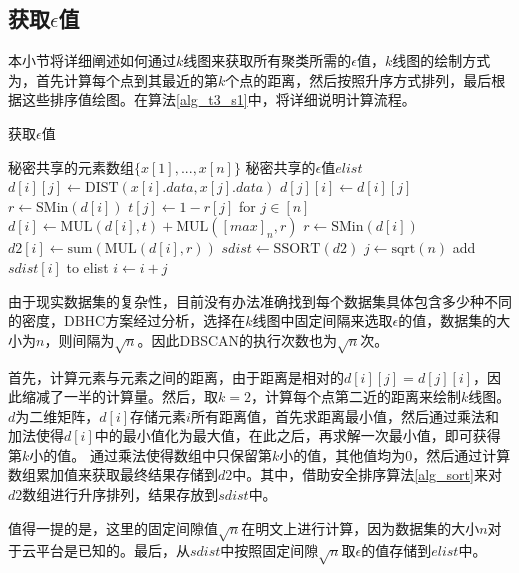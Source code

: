 \subsection{获取$\epsilon$值}
本小节将详细阐述如何通过$ k $线图来获取所有聚类所需的$\epsilon$值，$ k $线图的绘制方式为，首先计算每个点到其最近的第$ k $个点的距离，然后按照升序方式排列，最后根据这些排序值绘图。在算法\ref{alg_t3_s1}中，将详细说明计算流程。

\begin{algorithm}[htbp]
	\renewcommand{\algorithmicrequire}{\textbf{输入:}}
	\renewcommand{\algorithmicensure}{\textbf{输出:}}
	\caption{获取$\epsilon$值}
	\label{alg_t3_s1}
	\begin{algorithmic}[1]
		\REQUIRE 秘密共享的元素数组$ \{x[1],...,x[n]\} $
		\ENSURE 秘密共享的$\epsilon$值$ elist $
		\STATE $ d[i][j] \leftarrow \text{DIST}(x[i].data, x[j].data) $
		\STATE $ d[j][i] \leftarrow d[i][j] $
		\ENDFOR
		\ENDFOR
		\STATE $ r \leftarrow \text{SMin}(d[i]) $ %
		\STATE $ t[j] \leftarrow 1-r[j] $ for $ j\in[n] $
		\STATE $ d[i] \leftarrow \text{MUL}(d[i], t) + \text{MUL}([max]_n, r) $
		\STATE $ r \leftarrow \text{SMin}(d[i]) $
		\STATE $ d2[i] \leftarrow \text{sum}(\text{MUL}(d[i], r)) $ %
		\ENDFOR
		\STATE $ sdist \leftarrow \text{SSORT}(d2) $
		\STATE $ j \leftarrow \text{sqrt}(n) $
		\STATE add $ sdist[i] $ to elist
		\STATE $ i \leftarrow i + j $
		\ENDFOR
	\end{algorithmic}
\end{algorithm}

由于现实数据集的复杂性，目前没有办法准确找到每个数据集具体包含多少种不同的密度，DBHC方案\cite{latifi2021dbhc}经过分析，选择在$ k $线图中固定间隔来选取$\epsilon$的值，数据集的大小为$ n $，则间隔为$ \sqrt{n} $。因此DBSCAN的执行次数也为$ \sqrt{n} $次。

首先，计算元素与元素之间的距离，由于距离是相对的$ d[i][j]=d[j][i] $，因此缩减了一半的计算量。然后，取$ k=2 $，计算每个点第二近的距离来绘制$ k $线图。$ d $为二维矩阵，$ d[i] $存储元素$ i $所有距离值，首先求距离最小值，然后通过乘法和加法使得$ d[i] $中的最小值化为最大值，在此之后，再求解一次最小值，即可获得第$ k $小的值。
通过乘法使得数组中只保留第$ k $小的值，其他值均为0，然后通过计算数组累加值来获取最终结果存储到$ d2 $中。其中，借助安全排序算法\ref{alg_sort}来对$ d2 $数组进行升序排列，结果存放到$ sdist $中。

值得一提的是，这里的固定间隙值$ \sqrt{n} $在明文上进行计算，因为数据集的大小$ n $对于云平台是已知的。最后，从$ sdist $中按照固定间隙$ \sqrt{n} $取$\epsilon$的值存储到$ elist $中。


